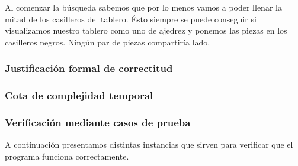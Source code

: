 \documentclass[11pt, a4paper, twoside]{article}
\begin{document}
Al comenzar la búsqueda sabemos que por lo menos vamos a
poder llenar la mitad de los casilleros del tablero. Ésto siempre se puede
conseguir si visualizamos nuestro tablero como uno de ajedrez y ponemos las
piezas en los casilleros negros. Ningún par de piezas compartiría lado. 



\subsubsection{Justificación formal de correctitud}

\subsubsection{Cota de complejidad temporal}

\subsubsection{Verificación mediante casos de prueba}

A continuación presentamos distintas instancias que sirven para verificar que el programa funciona correctamente.\\
\end{document}
